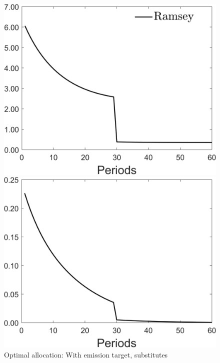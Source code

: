 \begin{figure}[h!!]
	\centering
	\caption{Optimal allocation: With emission target, substitutes }\label{fig:optallo_subst_onlyR_target}
	\begin{minipage}[]{0.32\textwidth}
		\includegraphics[width=1\textwidth]{../codding_model/Own/figures/Rep_agent/staticonlyRam_separate_c_periods59_eppsilon4.00_zeta1.40_Ad08_Ac04_thetac0.70_thetad0.56_HetGrowth1_tauul0.181_util0_withtarget1_lgd1.png}
	\end{minipage}
	\begin{minipage}[]{0.32\textwidth}
		\includegraphics[width=1\textwidth]{../codding_model/Own/figures/Rep_agent/staticonlyRam_separate_hh_periods59_eppsilon4.00_zeta1.40_Ad08_Ac04_thetac0.70_thetad0.56_HetGrowth1_tauul0.181_util0_withtarget1_lgd0.png}

\end{minipage}
\end{figure}
